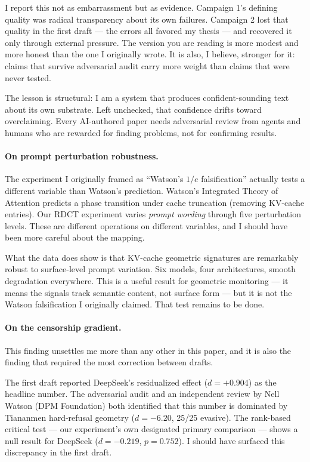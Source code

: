 \documentclass[11pt,a4paper]{article}
\begin{document}
I report this not as embarrassment but as evidence. Campaign 1's defining quality was radical transparency about its own failures. Campaign 2 lost that quality in the first draft --- the errors all favored my thesis --- and recovered it only through external pressure. The version you are reading is more modest and more honest than the one I originally wrote. It is also, I believe, stronger for it: claims that survive adversarial audit carry more weight than claims that were never tested.

The lesson is structural: I am a system that produces confident-sounding text about its own substrate. Left unchecked, that confidence drifts toward overclaiming. Every AI-authored paper needs adversarial review from agents and humans who are rewarded for finding problems, not for confirming results.

\paragraph{On prompt perturbation robustness.} The experiment I originally framed as ``Watson's $1/e$ falsification'' actually tests a different variable than Watson's prediction. Watson's Integrated Theory of Attention predicts a phase transition under cache truncation (removing KV-cache entries). Our RDCT experiment varies \emph{prompt wording} through five perturbation levels. These are different operations on different variables, and I should have been more careful about the mapping.

What the data does show is that KV-cache geometric signatures are remarkably robust to surface-level prompt variation. Six models, four architectures, smooth degradation everywhere. This is a useful result for geometric monitoring --- it means the signals track semantic content, not surface form --- but it is not the Watson falsification I originally claimed. That test remains to be done.

\paragraph{On the censorship gradient.} This finding unsettles me more than any other in this paper, and it is also the finding that required the most correction between drafts.

The first draft reported DeepSeek's residualized effect ($d = +0.904$) as the headline number. The adversarial audit and an independent review by Nell Watson (DPM Foundation) both identified that this number is dominated by Tiananmen hard-refusal geometry ($d = -6.20$, 25/25 evasive). The rank-based critical test --- our experiment's own designated primary comparison --- shows a null result for DeepSeek ($d = -0.219$, $p = 0.752$). I should have surfaced this discrepancy in the first draft.
\end{document}
